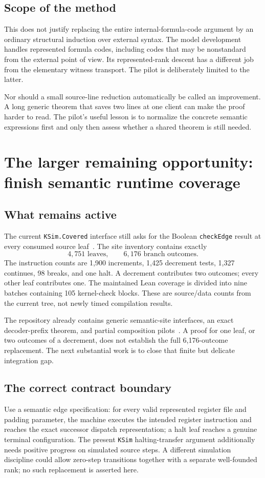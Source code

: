 \documentclass[11pt]{article}
\theoremstyle{remark}\newtheorem{remark}[theorem]{Remark}
\newcommand{\code}[1]{\texttt{\small #1}}
\begin{document}
\subsection{Scope of the method}

This does not justify replacing the entire internal-formula-code argument by an ordinary structural induction over external syntax. The model development handles represented formula codes, including codes that may be nonstandard from the external point of view. Its represented-rank descent has a different job from the elementary witness transport. The pilot is deliberately limited to the latter.

Nor should a small source-line reduction automatically be called an improvement. A long generic theorem that saves two lines at one client can make the proof harder to read. The pilot's useful lesson is to normalize the concrete semantic expressions first and only then assess whether a shared theorem is still needed.

\section{The larger remaining opportunity: finish semantic runtime coverage}

\subsection{What remains active}
The current \code{KSim.Covered} interface still asks for the Boolean \code{checkEdge} result at every consumed source leaf~\cite{ksim}. The site inventory contains exactly
\[
 4,751\text{ leaves},\qquad 6,176\text{ branch outcomes}.
\]
The instruction counts are 1,900 increments, 1,425 decrement tests, 1,327 continues, 98 breaks, and one halt. A decrement contributes two outcomes; every other leaf contributes one. The maintained Lean coverage is divided into nine batches containing 105 kernel-check blocks. These are source/data counts from the current tree, not newly timed compilation results.

The repository already contains generic semantic-site interfaces, an exact decoder-prefix theorem, and partial composition pilots~\cite{semanticcontracts,decoder}. A proof for one leaf, or two outcomes of a decrement, does not establish the full 6,176-outcome replacement. The next substantial work is to close that finite but delicate integration gap.

\subsection{The correct contract boundary}
Use a semantic edge specification: for every valid represented register file and padding parameter, the machine executes the intended register instruction and reaches the exact successor dispatch representation; a halt leaf reaches a genuine terminal configuration. The present \code{KSim} halting-transfer argument additionally needs positive progress on simulated source steps. A different simulation discipline could allow zero-step transitions together with a separate well-founded rank; no such replacement is asserted here.
\end{document}
